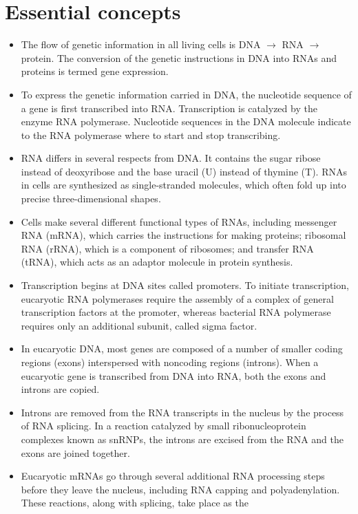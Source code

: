 \section{Essential concepts}

\begin{itemize}
\item The flow of genetic information in all living cells is DNA $\rightarrow$ RNA $\rightarrow$
protein. The conversion of the genetic instructions in DNA into RNAs
and proteins is termed gene expression.
\item To express the genetic information carried in DNA, the nucleotide
sequence of a gene is first transcribed into RNA. Transcription is catalyzed by the enzyme RNA polymerase. Nucleotide sequences in the
DNA molecule indicate to the RNA polymerase where to start and
stop transcribing.
\item RNA differs in several respects from DNA. It contains the sugar ribose
instead of deoxyribose and the base uracil (U) instead of thymine (T).
RNAs in cells are synthesized as single-stranded molecules, which
often fold up into precise three-dimensional shapes.
\item Cells make several different functional types of RNAs, including
messenger RNA (mRNA), which carries the instructions for making
proteins; ribosomal RNA (rRNA), which is a component of ribosomes;
and transfer RNA (tRNA), which acts as an adaptor molecule in protein synthesis.
\item Transcription begins at DNA sites called promoters. To initiate transcription,
eucaryotic RNA polymerases require the assembly of a
complex of general transcription factors at the promoter, whereas
bacterial RNA polymerase requires only an additional subunit, called
sigma factor.
\item In eucaryotic DNA, most genes are composed of a number of smaller
coding regions (exons) interspersed with noncoding regions (introns).
When a eucaryotic gene is transcribed from DNA into RNA, both the
exons and introns are copied.
\item Introns are removed from the RNA transcripts in the nucleus by the
process of RNA splicing. In a reaction catalyzed by small ribonucleoprotein
complexes known as snRNPs, the introns are excised from
the RNA and the exons are joined together.
\item Eucaryotic mRNAs go through several additional RNA processing
steps before they leave the nucleus, including RNA capping and polyadenylation.
These reactions, along with splicing, take place as the

\end{itemize}

